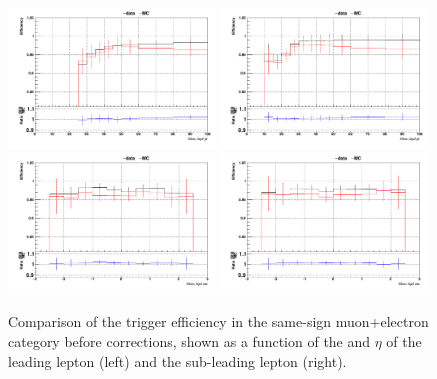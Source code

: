 \begin{figure}[htp]
\centering
\includegraphics[width=0.49\textwidth]{ch6_figs/1D_eff_lep1_pt_eu_ARCv2_change_3l_pt_ranges.pdf}
\includegraphics[width=0.49\textwidth]{ch6_figs/1D_eff_lep2_pt_eu_ARCv2_change_3l_pt_ranges.pdf} \\
\includegraphics[width=0.49\textwidth]{ch6_figs/1D_eff_lep1_eta_eu_ARCv2_change_3l_pt_ranges.pdf}
\includegraphics[width=0.49\textwidth]{ch6_figs/1D_eff_lep2_eta_eu_ARCv2_change_3l_pt_ranges.pdf}
\caption{Comparison of the trigger efficiency in the same-sign muon+electron category before 
corrections, shown as a function of the \pt and $\eta$ of the leading lepton (left) 
and the sub-leading lepton (right).}
\label{fig:trigeffsemu}
\end{figure}


